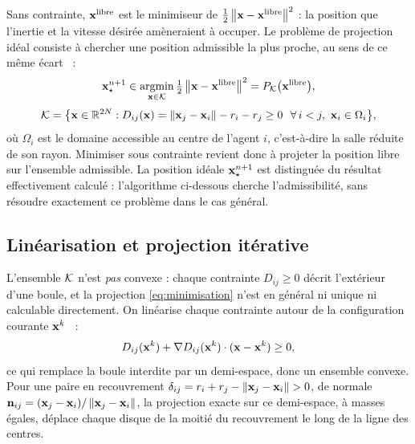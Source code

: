 Sans contrainte, $\mathbf{x}^{\mathrm{libre}}$ est le minimiseur de
$\tfrac12\left\lVert \mathbf{x}-\mathbf{x}^{\mathrm{libre}} \right\rVert^2$ : la position que l'inertie et la
vitesse désirée amèneraient à occuper. Le problème de projection idéal consiste à
chercher une position admissible la plus proche, au sens de ce même
écart~\cite{maury2008,maury2011} :
\begin{equation}
\label{eq:minimisation}
\mathbf{x}_\star^{n+1} \in \operatorname*{argmin}_{\mathbf{x}\in\mathcal{K}}
\tfrac12\left\lVert \mathbf{x}-\mathbf{x}^{\mathrm{libre}} \right\rVert^2
= P_{\mathcal{K}}\bigl(\mathbf{x}^{\mathrm{libre}}\bigr),
\end{equation}
\[
\mathcal{K}=\bigl\{\mathbf{x}\in\mathbb{R}^{2N} :
D_{ij}(\mathbf{x})=\left\lVert \mathbf{x}_j-\mathbf{x}_i \right\rVert-r_i-r_j\geq 0\ \ \forall\, i<j,\
\mathbf{x}_i\in\Omega_i\bigr\},
\]
où $\Omega_i$ est le domaine accessible au centre de l'agent $i$, c'est-à-dire
la salle réduite de son rayon. Minimiser sous contrainte revient donc à projeter
la position libre sur l'ensemble admissible. La position idéale $\mathbf{x}_\star^{n+1}$
est distinguée du résultat effectivement calculé : l'algorithme ci-dessous cherche
l'admissibilité, sans résoudre exactement ce problème dans le cas général.

\subsection{Linéarisation et projection itérative}

L'ensemble $\mathcal{K}$ n'est \emph{pas} convexe : chaque contrainte
$D_{ij}\geq 0$ décrit l'extérieur d'une boule, et la projection
\eqref{eq:minimisation} n'est en général ni unique ni calculable directement.
On linéarise chaque contrainte autour de la configuration courante
$\mathbf{x}^{k}$~\cite{maury2008} :
\[
D_{ij}(\mathbf{x}^{k})+\nabla D_{ij}(\mathbf{x}^{k})\cdot(\mathbf{x}-\mathbf{x}^{k})\geq 0 ,
\]
ce qui remplace la boule interdite par un demi-espace, donc un ensemble convexe.
Pour une paire en recouvrement
$\delta_{ij}=r_i+r_j-\left\lVert \mathbf{x}_j-\mathbf{x}_i \right\rVert>0$, de normale
$\mathbf{n}_{ij}=(\mathbf{x}_j-\mathbf{x}_i)/\left\lVert \mathbf{x}_j-\mathbf{x}_i \right\rVert$, la projection exacte sur ce
demi-espace, à masses égales, déplace chaque disque de la moitié du recouvrement
le long de la ligne des centres.


